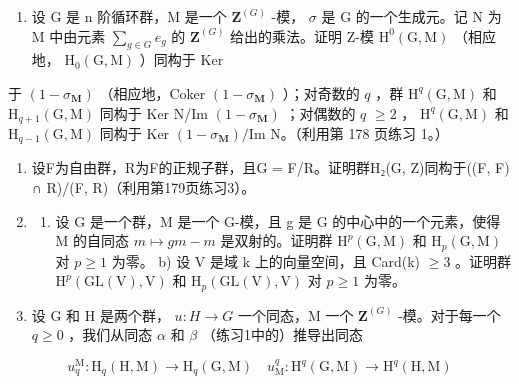 \begin{enumerate}
\def\labelenumi{\arabic{enumi})}
\setcounter{enumi}{6}
\tightlist
\item
  设 G 是 n 阶循环群，M 是一个 \(\mathbf{Z}^{(G)}\) -模， \(\sigma\) 是 G 的一个生成元。记 N 为 M 中由元素 \(\sum_{g\in G}e_{g}\) 的 \(\mathbf{Z}^{(G)}\) 给出的乘法。证明 Z-模 \(\mathrm{H}^{0}(\mathrm{G},\mathrm{M})\) （相应地， \(\mathrm{H}_{0}(\mathrm{G},\mathrm{M})\) ）同构于 Ker
\end{enumerate}

于 \((1 - \sigma_{\mathbf{M}})\) （相应地，Coker \((1 - \sigma_{\mathbf{M}})\) ）；对奇数的 \(q\) ，群 \(\mathrm{H}^q (\mathrm{G},\mathrm{M})\) 和 \(\mathrm{H}_{q + 1}(\mathrm{G},\mathrm{M})\) 同构于 Ker N/Im \((1 - \sigma_{\mathbf{M}})\) ；对偶数的 \(q\) \(\geqslant 2\) ， \(\mathrm{H}^q (\mathrm{G},\mathrm{M})\) 和 \(\mathrm{H}_{q - 1}(\mathrm{G},\mathrm{M})\) 同构于 Ker \((1 - \sigma_{\mathbf{M}}) / \mathrm{Im}\) N。（利用第 178 页练习 1。）

\begin{enumerate}
\def\labelenumi{\arabic{enumi})}
\setcounter{enumi}{7}
\item
  设F为自由群，R为F的正规子群，且G = F/R。证明群H₂(G, Z)同构于((F, F) ∩ R)/(F, R)（利用第179页练习3）。
\item
  \begin{enumerate}
  \def\labelenumii{\alph{enumii})}
  \tightlist
  \item
    设 G 是一个群，M 是一个 G-模，且 g 是 G 的中心中的一个元素，使得 M 的自同态 \(m \mapsto gm - m\) 是双射的。证明群 \(\mathrm{H}^{p}(\mathrm{G}, \mathrm{M})\) 和 \(\mathrm{H}_{p}(\mathrm{G}, \mathrm{M})\) 对 \(p \geqslant 1\) 为零。 b) 设 V 是域 k 上的向量空间，且 Card(k) \(\geqslant 3\) 。证明群 \(\mathrm{H}^{p}(\mathrm{GL}(\mathrm{V}), \mathrm{V})\) 和 \(\mathrm{H}_{p}(\mathrm{GL}(\mathrm{V}), \mathrm{V})\) 对 \(p \geqslant 1\) 为零。
  \end{enumerate}
\item
  设 G 和 H 是两个群， \(u: H \to G\) 一个同态，M 一个 \(\mathbf{Z}^{(G)}\) -模。对于每一个 \(q \geqslant 0\) ，我们从同态 \(\alpha\) 和 \(\beta\) （练习1中的）推导出同态
\end{enumerate}

\[
u _ {q} ^ {\mathrm{M}}: \mathrm{H} _ {q} (\mathrm{H}, \mathrm{M}) \rightarrow \mathrm{H} _ {q} (\mathrm{G}, \mathrm{M}) \quad u _ {\mathrm{M}} ^ {q}: \mathrm{H} ^ {q} (\mathrm{G}, \mathrm{M}) \rightarrow \mathrm{H} ^ {q} (\mathrm{H}, \mathrm{M})
\]

